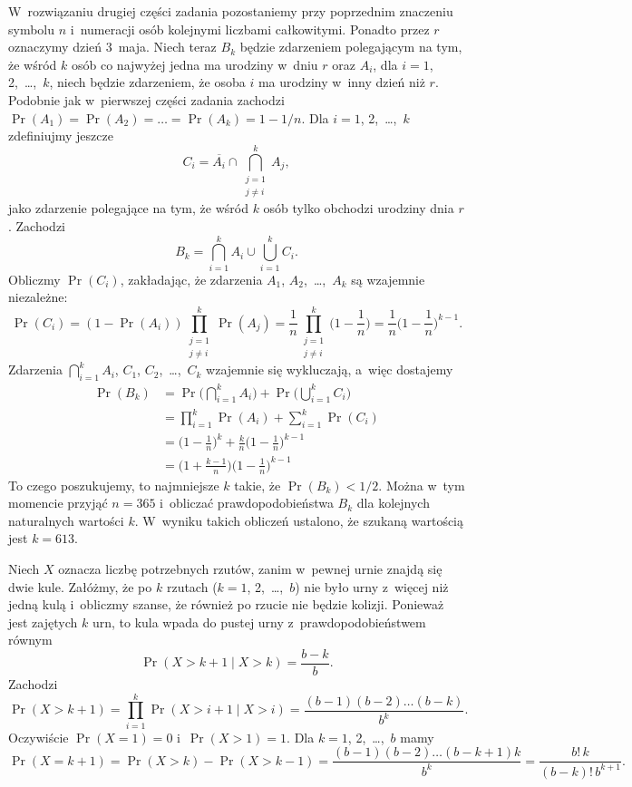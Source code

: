 W~rozwiązaniu drugiej części zadania pozostaniemy przy poprzednim znaczeniu symbolu $n$ i~numeracji osób kolejnymi liczbami całkowitymi. Ponadto przez $r$ oznaczymy dzień 3~maja. Niech teraz $B_k$ będzie zdarzeniem polegającym na tym, że wśród $k$ osób co najwyżej jedna ma urodziny w~dniu $r$ oraz $A_i$, dla $i=1$, 2,~\dots,~$k$, niech będzie zdarzeniem, że osoba $i$ ma urodziny w~inny dzień niż $r$. Podobnie jak w~pierwszej części zadania zachodzi $\Pr(A_1)=\Pr(A_2)=\dots=\Pr(A_k)=1-1/n$. Dla $i=1$, 2,~\dots,~$k$ zdefiniujmy jeszcze
\[
	C_i = \overline{A_i}\cap\bigcap_{\substack{j=1\\j\ne i}}^kA_j,
\]
jako zdarzenie polegające na tym, że wśród $k$ osób tylko  obchodzi urodziny dnia $r$. Zachodzi
\[
	B_k = \bigcap_{i=1}^kA_i\cup\bigcup_{i=1}^kC_i.
\]
Obliczmy $\Pr(C_i)$, zakładając, że zdarzenia $A_1$, $A_2$,~\dots,~$A_k$ są wzajemnie niezależne:
\[
	\Pr(C_i) = (1-\Pr(A_i))\prod_{\substack{j=1\\j\ne i}}^k\Pr(A_j) = \frac{1}{n}\prod_{\substack{j=1\\j\ne i}}^k\biggl(1-\frac{1}{n}\biggr) = \frac{1}{n}\biggl(1-\frac{1}{n}\biggr)^{k-1}.
\]
Zdarzenia $\bigcap_{i=1}^kA_i$, $C_1$, $C_2$,~\dots,~$C_k$ wzajemnie się wykluczają, a~więc dostajemy
\begin{align*}
	\Pr(B_k) &= \Pr\biggl(\bigcap_{i=1}^kA_i\biggr)+\Pr\biggl(\bigcup_{i=1}^kC_i\biggr) \\
	&= \prod_{i=1}^k\Pr(A_i)+\sum_{i=1}^k\Pr(C_i) \\
	&= \biggl(1-\frac{1}{n}\biggr)^k+\frac{k}{n}\biggl(1-\frac{1}{n}\biggr)^{k-1} \\
	&= \biggl(1+\frac{k-1}{n}\biggr)\biggl(1-\frac{1}{n}\biggr)^{k-1}
\end{align*}
To czego poszukujemy, to najmniejsze $k$ takie, że $\Pr(B_k)<1/2$. Można w~tym momencie przyjąć $n=365$ i~obliczać prawdopodobieństwa $B_k$ dla kolejnych naturalnych wartości $k$. W~wyniku takich obliczeń ustalono, że szukaną wartością jest $k=613$.

\exercise %
Niech $X$ oznacza liczbę potrzebnych rzutów, zanim w~pewnej urnie znajdą się dwie kule. Załóżmy, że po $k$ rzutach ($k=1$, 2,~\dots,~$b$) nie było urny z~więcej niż jedną kulą i~obliczmy szanse, że również po  rzucie nie będzie kolizji. Ponieważ jest zajętych $k$ urn, to  kula wpada do pustej urny z~prawdopodobieństwem równym
\[
	\Pr(X>k+1\mid X>k) = \frac{b-k}{b}.
\]
Zachodzi
\[
	\Pr(X>k+1) = \prod_{i=1}^k\Pr(X>i+1\mid X>i) = \frac{(b-1)(b-2)\dots(b-k)}{b^k}.
\]
Oczywiście $\Pr(X=1)=0$ i~$\Pr(X>1)=1$. Dla $k=1$, 2,~\dots,~$b$ mamy
\[
	\Pr(X=k+1) = \Pr(X>k)-\Pr(X>k-1) = \frac{(b-1)(b-2)\dots(b-k+1)k}{b^k} = \frac{b!\,k}{(b-k)!\,b^{k+1}}.
\]

